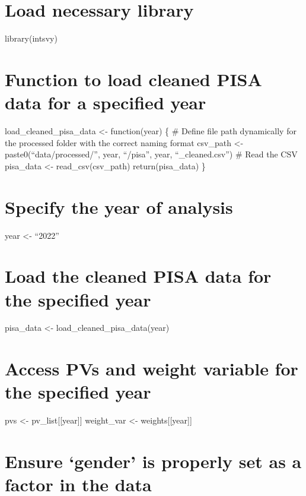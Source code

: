 \documentclass[
]{article}
\begin{document}
\hypertarget{load-necessary-library}{%
\section{Load necessary library}\label{load-necessary-library}}

library(intsvy)

\hypertarget{function-to-load-cleaned-pisa-data-for-a-specified-year}{%
\section{Function to load cleaned PISA data for a specified
year}\label{function-to-load-cleaned-pisa-data-for-a-specified-year}}

load\_cleaned\_pisa\_data \textless- function(year) \{ \# Define file
path dynamically for the processed folder with the correct naming format
csv\_path \textless- paste0(``data/processed/'', year, ``/pisa'', year,
``\_cleaned.csv'') \# Read the CSV pisa\_data \textless-
read\_csv(csv\_path) return(pisa\_data) \}

\hypertarget{specify-the-year-of-analysis}{%
\section{Specify the year of
analysis}\label{specify-the-year-of-analysis}}

year \textless- ``2022''

\hypertarget{load-the-cleaned-pisa-data-for-the-specified-year}{%
\section{Load the cleaned PISA data for the specified
year}\label{load-the-cleaned-pisa-data-for-the-specified-year}}

pisa\_data \textless- load\_cleaned\_pisa\_data(year)

\hypertarget{access-pvs-and-weight-variable-for-the-specified-year}{%
\section{Access PVs and weight variable for the specified
year}\label{access-pvs-and-weight-variable-for-the-specified-year}}

pvs \textless- pv\_list{[}{[}year{]}{]} weight\_var \textless-
weights{[}{[}year{]}{]}

\hypertarget{ensure-gender-is-properly-set-as-a-factor-in-the-data}{%
\section{Ensure `gender' is properly set as a factor in the
data}\label{ensure-gender-is-properly-set-as-a-factor-in-the-data}}
\end{document}
